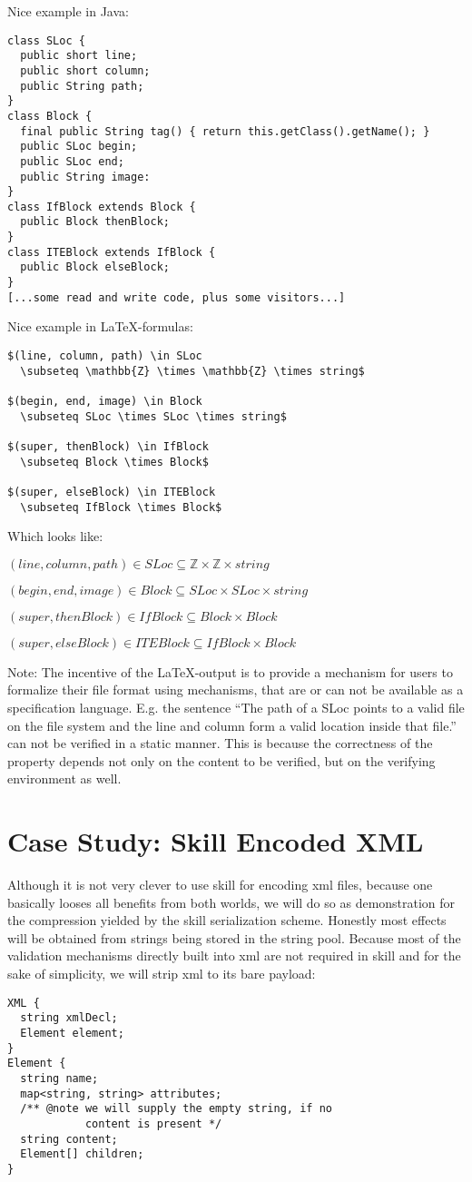 \documentclass[a4paper,10pt]{article}
\begin{document}
Nice example in Java:
\begin{verbatim}
class SLoc {
  public short line;
  public short column;
  public String path;
}
class Block {
  final public String tag() { return this.getClass().getName(); }
  public SLoc begin;
  public SLoc end;
  public String image:
}
class IfBlock extends Block {
  public Block thenBlock;
}
class ITEBlock extends IfBlock {
  public Block elseBlock;
}
[...some read and write code, plus some visitors...]
\end{verbatim}


Nice example in \LaTeX-formulas:
\begin{verbatim}
$(line, column, path) \in SLoc
  \subseteq \mathbb{Z} \times \mathbb{Z} \times string$

$(begin, end, image) \in Block
  \subseteq SLoc \times SLoc \times string$

$(super, thenBlock) \in IfBlock
  \subseteq Block \times Block$

$(super, elseBlock) \in ITEBlock
  \subseteq IfBlock \times Block$
\end{verbatim}
Which looks like:

$(line, column, path) \in SLoc \subseteq \mathbb{Z} \times \mathbb{Z} \times string$

$(begin, end, image) \in Block \subseteq SLoc \times SLoc \times string$

$(super, thenBlock) \in IfBlock \subseteq Block \times Block$

$(super, elseBlock) \in ITEBlock \subseteq IfBlock \times Block$

Note: The incentive of the \LaTeX-output is to provide a mechanism for users to formalize their file format using mechanisms, that are or can not be available as a specification language. E.g. the sentence ``The path of a SLoc points to a valid file on the file system and the line and column form a valid location inside that file.'' can not be verified in a static manner. This is because the correctness of the property depends not only on the content to be verified, but on the verifying environment as well.

\section{Case Study: Skill Encoded XML}
Although it is not very clever to use skill for encoding xml files, because one basically looses all benefits from both worlds, we will do so as demonstration for the compression yielded by the skill serialization scheme. Honestly most effects will be obtained from strings being stored in the string pool. Because most of the validation mechanisms directly built into xml are not required in skill and for the sake of simplicity, we will strip xml to its bare payload:
\begin{lstlisting}[label=sex,caption=Skill Encoded XML]
XML {
  string xmlDecl;
  Element element;
}
Element {
  string name;
  map<string, string> attributes;
  /** @note we will supply the empty string, if no
            content is present */
  string content;
  Element[] children;
}
\end{lstlisting}
\end{document}
